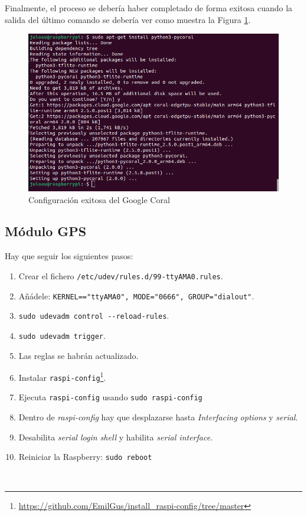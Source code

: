 Finalmente, el proceso se debería haber completado de forma exitosa cuando la salida del último comando se debería ver como muestra la Figura \ref{fig:outcoral}.

\begin{figure} [h!]
	\begin{center}
		\includegraphics[width=12cm]{figs/cap6/pycoralinstalled.png}
	\end{center}
	\caption{Configuración exitosa del Google Coral}
	\label{fig:outcoral}
\end{figure} 


\subsection{Módulo GPS}
\label{subsec:anexogps}

Hay que seguir los siguientes pasos: 

\begin{enumerate}
	\item Crear el fichero \verb|/etc/udev/rules.d/99-ttyAMA0.rules|.
	\item Añádele: \verb|KERNEL=="ttyAMA0", MODE="0666", GROUP="dialout"|.
	\item \verb|sudo udevadm control --reload-rules|.
	\item \verb|sudo udevadm trigger|.
	\item Las reglas se habrán actualizado. 
	\item Instalar \verb|raspi-config|\footnote{\url{https://github.com/EmilGus/install_raspi-config/tree/master}}.
	\item Ejecuta \verb|raspi-config| usando \verb|sudo raspi-config|
	\item Dentro de \textit{raspi-config} hay que desplazarse hasta \textit{Interfacing options} y \textit{serial}.
	\item Desabilita \textit{serial login shell} y habilita \textit{serial interface}.
	\item Reiniciar la Raspberry: \verb|sudo reboot|
\end{enumerate}\

